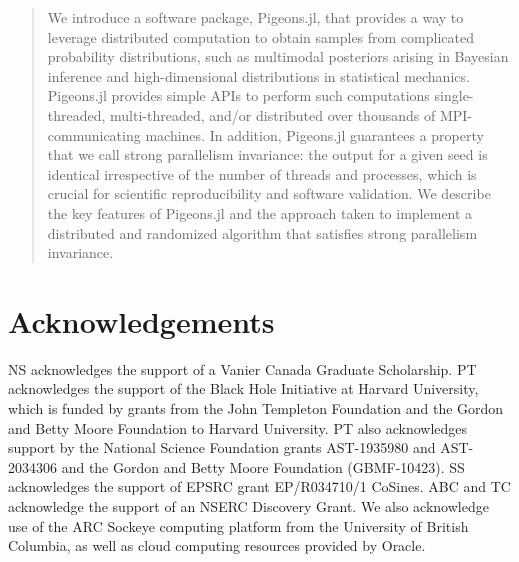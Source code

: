 \documentclass{juliacon}
\begin{document}


\maketitle

\begin{abstract}

We introduce a software package, Pigeons.jl, that provides a way to leverage distributed computation to 
obtain samples from complicated probability distributions, such as 
multimodal posteriors arising in Bayesian inference and high-dimensional 
distributions in statistical mechanics. Pigeons.jl provides simple APIs to 
perform such computations single-threaded, multi-threaded,
and/or distributed over thousands of MPI-communicating machines.
In addition, Pigeons.jl guarantees a property that we call strong parallelism invariance: the 
output for a given seed is identical irrespective of the number of threads and processes, 
which is crucial for scientific reproducibility and software validation. 
We describe the key features of Pigeons.jl and the approach taken to implement 
a distributed and randomized algorithm that satisfies strong parallelism invariance.

\end{abstract}








\section{Acknowledgements}
NS acknowledges the support of a Vanier Canada Graduate Scholarship. 
PT acknowledges the support of the Black Hole Initiative at Harvard University, 
which is funded by grants from the John Templeton Foundation and the 
Gordon and Betty Moore Foundation to Harvard University.
PT also acknowledges support by the National Science Foundation grants AST-1935980 
and AST-2034306 and the Gordon and Betty Moore Foundation (GBMF-10423).
SS acknowledges the support of EPSRC grant EP/R034710/1 CoSines.
ABC and TC acknowledge the support of an NSERC Discovery Grant.
We also acknowledge use of the ARC Sockeye computing platform from the
University of British Columbia, as well as cloud computing resources provided 
by Oracle.


\end{document}
